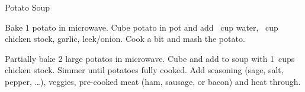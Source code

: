 
\begin{recipe}{Potato Soup}
  \maketitle

  Bake 1 potato in microwave. Cube potato in pot and add \half~cup water,
  \half~cup chicken stock, garlic, leek/onion. Cook a bit and mash the
  potato.

  Partially bake 2 large potatos in microwave. Cube and add to soup with
  1\half~cups chicken stock. Simmer until potatoes fully cooked. Add
  seasoning (sage, salt, pepper, \dots), veggies, pre-cooked meat (ham,
  sausage, or bacon) and heat through.
\end{recipe}

